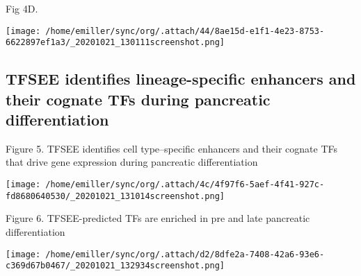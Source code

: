 \documentclass[bigger]{beamer}
\begin{document}
\begin{frame}[label={sec:orgf89b08d}]{Fig 4D.}
\begin{center}
\texttt{[image: /home/emiller/sync/org/.attach/44/8ae15d-e1f1-4e23-8753-6622897ef1a3/\_20201021\_130111screenshot.png]}
\end{center}
\end{frame}

\subsection{TFSEE identifies lineage-specific enhancers and their cognate TFs during pancreatic differentiation}
\label{sec:orga8beff8}
\begin{frame}[label={sec:orgffe2a47}]{Figure 5. TFSEE identifies cell type–specific enhancers and their cognate TFs that drive gene expression during pancreatic differentiation}
\begin{center}
\texttt{[image: /home/emiller/sync/org/.attach/4c/4f97f6-5aef-4f41-927c-fd8680640530/\_20201021\_131014screenshot.png]}
\end{center}
\end{frame}
\begin{frame}[label={sec:org27a5dcc}]{Figure 6. TFSEE-predicted TFs are enriched in pre and late pancreatic differentiation}
\begin{center}
\texttt{[image: /home/emiller/sync/org/.attach/d2/8dfe2a-7408-42a6-93e6-c369d67b0467/\_20201021\_132934screenshot.png]}
\end{center}
\end{frame}
\end{document}
